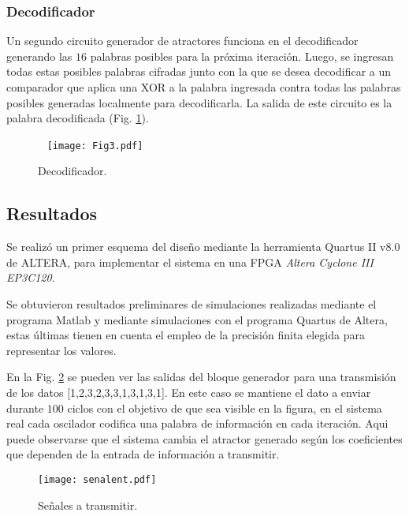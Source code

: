 \subsubsection{Decodificador}

Un segundo circuito generador de atractores funciona en el decodificador generando las $16$ palabras posibles para la próxima iteración.
Luego, se ingresan todas estas posibles palabras cifradas junto con la que se desea decodificar a un comparador que aplica una XOR a la palabra ingresada contra todas las palabras posibles generadas localmente para decodificarla.
La salida de este circuito es la palabra decodificada (Fig. \ref{fig:decodificador}).
%
\begin{figure}\
    \centering
    \texttt{[image: Fig3.pdf]}\\
    \caption{Decodificador.}\label{fig:decodificador}
\end{figure}

\subsection{Resultados}

Se realizó un primer esquema del diseño mediante la herramienta Quartus II v8.0 de ALTERA, para implementar el sistema en una FPGA \emph{Altera Cyclone III EP3C120}.

Se obtuvieron resultados preliminares de simulaciones realizadas mediante el programa Matlab y mediante simulaciones con el programa Quartus de Altera, estas últimas tienen en cuenta el empleo de la precisión finita elegida para representar los valores.

En la Fig. \ref{senal} se pueden ver las salidas del bloque generador para una transmisión de los datos [1,2,3,2,3,3,1,3,1,3,1].
En este caso se mantiene el dato a enviar durante $100$ ciclos con el objetivo de que sea visible en la figura, en el sistema real cada oscilador codifica una palabra de información en cada iteración.
Aqui puede observarse que el sistema cambia el atractor generado según los coeficientes que dependen de la entrada de información a transmitir.
%
\begin{figure}
	\centering
	\texttt{[image: senalent.pdf]}\\
	\caption{Señales a transmitir.}\label{senal}
\end{figure}
